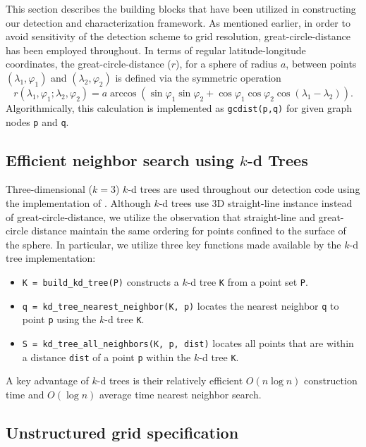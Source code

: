 \documentclass[gmdd, hvmath, online]{copernicus_discussions}
\begin{document}
This section describes the building blocks that have been utilized in constructing our detection and characterization framework.  As mentioned earlier, in order to avoid sensitivity of the detection scheme to grid resolution, great-circle-distance has been employed throughout.  In terms of regular latitude-longitude coordinates, the great-circle-distance ($r$), for a sphere of radius $a$, between points $(\lambda_1, \varphi_1)$ and $(\lambda_2, \varphi_2)$ is defined via the symmetric operation
\begin{equation}
r(\lambda_1, \varphi_1; \lambda_2, \varphi_2) = a \arccos \left( \sin \varphi_1 \sin \varphi_2 + \cos \varphi_1 \cos \varphi_2 \cos (\lambda_1 - \lambda_2) \right).
\end{equation}  Algorithmically, this calculation is implemented as \texttt{gcdist(p,q)} for given graph nodes \texttt{p} and \texttt{q}.

\subsection{Efficient neighbor search using $k$-d Trees}

Three-dimensional ($k=3$) $k$-d trees \citep{bentley1975multidimensional} are used throughout our detection code using the implementation of \cite{tsiombikas2015kdtree}.  Although $k$-d trees use 3D straight-line instance instead of great-circle-distance, we utilize the observation that straight-line and great-circle distance maintain the same ordering for points confined to the surface of the sphere.  In particular, we utilize three key functions made available by the $k$-d tree implementation:
\begin{itemize}
\item[] \texttt{K = build\_kd\_tree(P)} constructs a $k$-d tree \texttt{K} from a point set \texttt{P}.
\item[] \texttt{q = kd\_tree\_nearest\_neighbor(K, p)} locates the nearest neighbor \texttt{q} to point \texttt{p} using the $k$-d tree \texttt{K}.
\item[] \texttt{S = kd\_tree\_all\_neighbors(K, p, dist)} locates all points that are within a distance \texttt{dist} of a point \texttt{p} within the $k$-d tree \texttt{K}.
\end{itemize}

\noindent A key advantage of $k$-d trees is their relatively efficient $O(n \log n)$ construction time and $O(\log n)$ average time nearest neighbor search.

\subsection{Unstructured grid specification}
\end{document}
